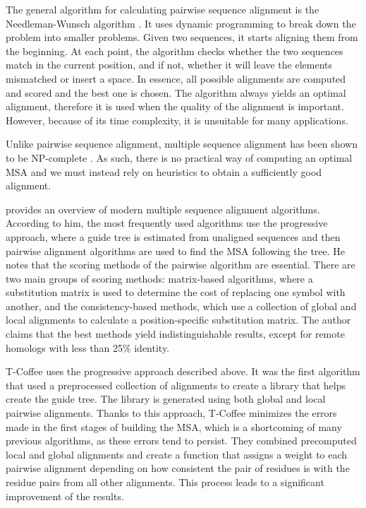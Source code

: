 The general algorithm for calculating pairwise sequence alignment is the Needleman-Wunsch algorithm \citep{needleman}. It uses dynamic programming
to break down the problem into smaller problems. Given two sequences, it starts aligning them from the beginning. At each point, the algorithm checks
whether the two sequences match in the current position, and if not, whether it will leave the elements mismatched or insert a space. In essence,
all possible alignments are computed and scored and the best one is chosen. The algorithm always yields an optimal alignment, therefore it is
used when the quality of the alignment is important. However, because of its time complexity, it is unsuitable for many applications.

Unlike pairwise sequence alignment, multiple sequence alignment has been shown to be NP-complete \citep{msa_complexity}. As such, there is no practical
way of computing an optimal MSA and we must instead rely on heuristics to obtain a sufficiently good alignment.

\cite{msa_overview} provides an overview of modern multiple sequence alignment algorithms. According to him, the most frequently used algorithms use
the progressive approach, where a guide tree is estimated from unaligned sequences and then pairwise alignment algorithms are used to find
the MSA following the tree. He notes that the scoring methods of the pairwise algorithm are essential. There are two main groups of scoring methods:
matrix-based algorithms, where a substitution matrix is used to determine the cost of replacing one symbol with another, and the consistency-based
methods, which use a collection of global and local alignments to calculate a position-specific substitution matrix. The author claims that
the best methods yield indistinguishable results, except for remote homologs with less than 25\% identity.

T-Coffee \citep{t_coffee} uses the progressive approach described above. It was the first algorithm that used a preprocessed collection of 
alignments to create a library that helps create the guide tree. The library is generated using both global and local pairwise alignments.
Thanks to this approach, T-Coffee minimizes the errors made in the first stages of building the MSA, which is a shortcoming of many previous
algorithms, as these errors tend to persist. They combined precomputed local and global alignments and create a function that assigns a weight to
each pairwise alignment depending on how consistent the pair of residues is with the residue pairs from all other alignments. This process
leads to a significant improvement of the results.

